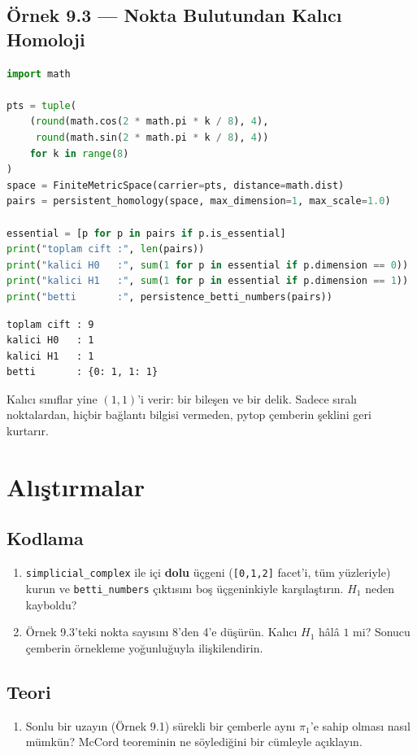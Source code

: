 \subsection*{Örnek 9.3 — Nokta Bulutundan Kalıcı Homoloji}

\begin{lstlisting}[language=Python]
import math

pts = tuple(
    (round(math.cos(2 * math.pi * k / 8), 4),
     round(math.sin(2 * math.pi * k / 8), 4))
    for k in range(8)
)
space = FiniteMetricSpace(carrier=pts, distance=math.dist)
pairs = persistent_homology(space, max_dimension=1, max_scale=1.0)

essential = [p for p in pairs if p.is_essential]
print("toplam cift :", len(pairs))
print("kalici H0   :", sum(1 for p in essential if p.dimension == 0))
print("kalici H1   :", sum(1 for p in essential if p.dimension == 1))
print("betti       :", persistence_betti_numbers(pairs))
\end{lstlisting}

\begin{verbatim}
toplam cift : 9
kalici H0   : 1
kalici H1   : 1
betti       : {0: 1, 1: 1}
\end{verbatim}

Kalıcı sınıflar yine $(1, 1)$'i verir: bir bileşen ve bir delik. Sadece sıralı
noktalardan, hiçbir bağlantı bilgisi vermeden, pytop çemberin şeklini geri
kurtarır.

\section{Alıştırmalar}

\subsection*{Kodlama}

\begin{enumerate}[label=K\arabic*.]
\item \texttt{simplicial\_complex} ile içi \textbf{dolu} üçgeni
      (\texttt{[0,1,2]} facet'i, tüm yüzleriyle) kurun ve \texttt{betti\_numbers}
      çıktısını boş üçgeninkiyle karşılaştırın. $H_1$ neden kayboldu?
\item Örnek 9.3'teki nokta sayısını 8'den 4'e düşürün. Kalıcı $H_1$ hâlâ
      $1$ mi? Sonucu çemberin örnekleme yoğunluğuyla ilişkilendirin.
\end{enumerate}

\subsection*{Teori}

\begin{enumerate}[label=T\arabic*.]
\item Sonlu bir uzayın (Örnek 9.1) sürekli bir çemberle aynı $\pi_1$'e sahip
      olması nasıl mümkün? McCord teoreminin ne söylediğini bir cümleyle açıklayın.
\end{enumerate}
